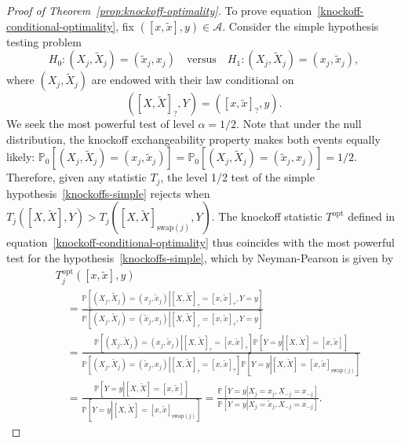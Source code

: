 \documentclass[ejs]{imsart}
\numberwithin{equation}{section}
\theoremstyle{plain}
\theoremstyle{definition}
\theoremstyle{remark}
\newcommand{\srx}{X}
\newcommand{\sfx}{x}
\newcommand{\srxk}{\widetilde X}
\newcommand{\sfxk}{\widetilde x}
\newcommand{\sry}{Y}
\newcommand{\sfy}{y}
\begin{document}
\begin{proof}[Proof of Theorem~\ref{prop:knockoff-optimality}]
	
	To prove equation~\eqref{knockoff-conditional-optimality}, fix $([\sfx, \sfxk], \sfy) \in \mathcal A$. Consider the simple hypothesis testing problem
	\begin{equation}
	H_0: (\srx_j, \srxk_j) = (\sfxk_j, \sfx_j) \quad \text{versus} \quad H_1: (\srx_j, \srxk_j) = (\sfx_j, \sfxk_j),
	\label{knockoffs-simple}
	\end{equation}
	where $(\srx_j, \srxk_j)$ are endowed with their law conditional on 
	\begin{equation*}
	([\srx, \srxk]_?, \sry) = ([\sfx, \sfxk]_?, \sfy).
	\end{equation*}
	We seek the most powerful test of level $\alpha = 1/2$. Note that under the null distribution, the knockoff exchangeability property makes both events equally likely: $\mathbb P_0[(\srx_j, \srxk_j) = (\sfx_j, \sfxk_j)] = \mathbb P_0[(\srx_j, \srxk_j) = (\sfxk_j, \sfx_j)] = 1/2$. Therefore, given any statistic $T_j$, the level 1/2 test of the simple hypothesis~\eqref{knockoffs-simple} rejects when $T_j([\srx, \srxk], \sry) > T_j([\srx, \srxk]_{\text{swap}(j)}, \sry)$. The knockoff statistic $T^{\text{opt}}$ defined in equation~\eqref{knockoff-conditional-optimality} thus coincides with the most powerful test for the hypothesis~\eqref{knockoffs-simple}, which by Neyman-Pearson is given by
	\begin{equation*}
	\begin{split}
	&T^{\text{opt}}_j([\sfx, \sfxk], \sfy) \\
	&\quad= \frac{\mathbb P\left[\left.(\srx_j, \srxk_j) = (\sfx_j, \sfxk_j)\right|[\srx, \srxk]_? = [\sfx, \sfxk]_?, \sry = \sfy\right]}{\mathbb P\left[\left.(\srx_j, \srxk_j) = (\sfxk_j, \sfx_j)\right|[\srx, \srxk]_? = [\sfx, \sfxk]_?, \sry = \sfy\right]} \\
	&\quad= \frac{\mathbb P\left[\left.(\srx_j, \srxk_j) = (\sfx_j, \sfxk_j)\right| [\srx, \srxk]_? = [\sfx, \sfxk]_?\right]\mathbb P\left[\sry = \sfy\left|[\srx, \srxk] = [\sfx,\sfxk]\right.\right]}{\mathbb P\left[\left.(\srx_j, \srxk_j) = (\sfxk_j, \sfx_j)\right| [\srx, \srxk]_? = [\sfx, \sfxk]_?\right]\mathbb P\left[\sry = \sfy\left|[\srx, \srxk] = [\sfx,\sfxk]_{\text{swap}(j)}\right.\right]} \\
	&\quad= \frac{\mathbb P\left[\sry = \sfy\left|[\srx, \srxk] = [\sfx,\sfxk]\right.\right]}{\mathbb P\left[\sry = \sfy\left|[\srx, \srxk] = [\sfx,\sfxk]_{\text{swap}(j)}\right.\right]} = \frac{\mathbb P\left[\sry = \sfy\left|\srx_j = \sfx_j, \srx_{-j} = \sfx_{-j}\right.\right]}{\mathbb P\left[\sry = \sfy\left|\srx_j = \sfxk_j, \srx_{-j} = \sfx_{-j}\right.\right]}.

\end{split}
\end{equation*}
\end{proof}
\end{document}
